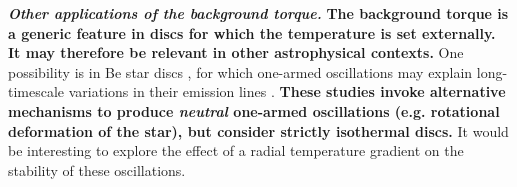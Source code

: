 {\bf\emph{Other applications of the background torque.}}     
{\bf The background torque is a generic feature in  
  discs for which the temperature is set externally.  It may therefore
  be relevant in other astrophysical contexts. }
One possibility is in Be star discs \citep{rivinius13}, 
for which one-armed oscillations may explain long-timescale variations
in their emission lines \citep[see e.g.][and references 
therein]{okasaki97,papaloizou06c,ogilvie08}. {\bf These studies 
invoke alternative mechanisms to produce \emph{neutral} one-armed
oscillations (e.g. rotational deformation of the star), but consider 
strictly isothermal discs.} It would be interesting to explore
the effect of a radial temperature gradient on the stability of these
oscillations. 


